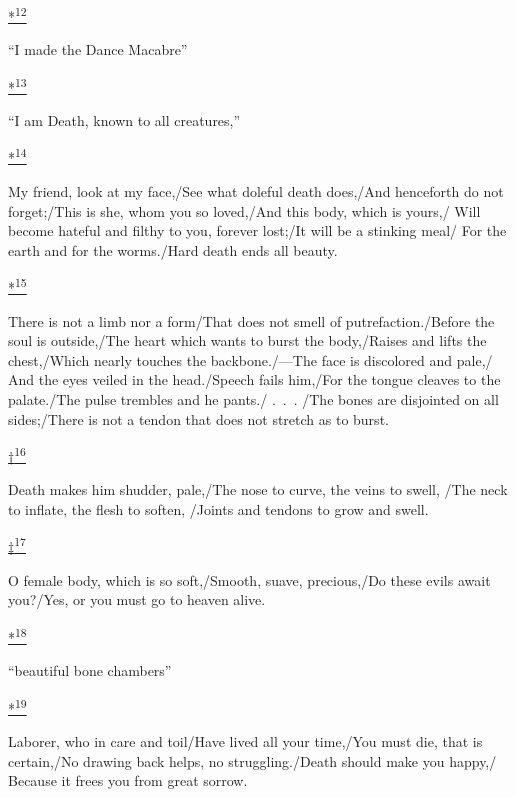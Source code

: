 \protect\hypertarget{23_NOTES.xhtmlux5cux23id_2974}{\protect\hyperlink{12_Chapter_Five__THE_VISION_OF_DEAT.xhtmlux5cux23id_2973}{*\textsuperscript{12}}}
``I made the Dance Macabre''

\protect\hypertarget{23_NOTES.xhtmlux5cux23id_2976}{\protect\hyperlink{12_Chapter_Five__THE_VISION_OF_DEAT.xhtmlux5cux23id_2975}{*\textsuperscript{13}}}
``I am Death, known to all creatures,''

\protect\hypertarget{23_NOTES.xhtmlux5cux23id_2978}{\protect\hyperlink{12_Chapter_Five__THE_VISION_OF_DEAT.xhtmlux5cux23id_2977}{*\textsuperscript{14}}}
My friend, look at my face,/See what doleful death does,/And henceforth
do not forget;/This is she, whom you so loved,/And this body, which is
yours,/ Will become hateful and filthy to you, forever lost;/It will be
a stinking meal/ For the earth and for the worms./Hard death ends all
beauty.

\protect\hypertarget{23_NOTES.xhtmlux5cux23id_2980}{\protect\hyperlink{12_Chapter_Five__THE_VISION_OF_DEAT.xhtmlux5cux23id_2979}{*\textsuperscript{15}}}
There is not a limb nor a form/That does not smell of
putrefaction./Before the soul is outside,/The heart which wants to burst
the body,/Raises and lifts the chest,/Which nearly touches the
backbone./---The face is discolored and pale,/ And the eyes veiled in
the head./Speech fails him,/For the tongue cleaves to the palate./The
pulse trembles and he pants./ .~.~. /The bones are disjointed on all
sides;/There is not a tendon that does not stretch as to burst.

\protect\hypertarget{23_NOTES.xhtmlux5cux23id_2982}{\protect\hyperlink{12_Chapter_Five__THE_VISION_OF_DEAT.xhtmlux5cux23id_2981}{†\textsuperscript{16}}}
Death makes him shudder, pale,/The nose to curve, the veins to swell,
/The neck to inflate, the flesh to soften, /Joints and tendons to grow
and swell.

\protect\hypertarget{23_NOTES.xhtmlux5cux23id_2984}{\protect\hyperlink{12_Chapter_Five__THE_VISION_OF_DEAT.xhtmlux5cux23id_2983}{‡\textsuperscript{17}}}
O female body, which is so soft,/Smooth, suave, precious,/Do these evils
await you?/Yes, or you must go to heaven alive.

\protect\hypertarget{23_NOTES.xhtmlux5cux23id_2986}{\protect\hyperlink{12_Chapter_Five__THE_VISION_OF_DEAT.xhtmlux5cux23id_2985}{*\textsuperscript{18}}}
``beautiful bone chambers''

\protect\hypertarget{23_NOTES.xhtmlux5cux23id_2988}{\protect\hyperlink{12_Chapter_Five__THE_VISION_OF_DEAT.xhtmlux5cux23id_2987}{*\textsuperscript{19}}}
Laborer, who in care and toil/Have lived all your time,/You must die,
that is certain,/No drawing back helps, no struggling./Death should make
you happy,/ Because it frees you from great sorrow.

